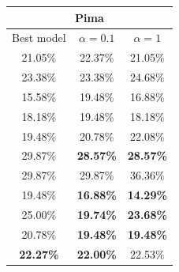 \documentclass[a4paper,12pt ]{report}
\begin{document}
\begin{table}[h]
\begin{minipage}{0.55\textwidth}
\end{minipage}%
\begin{minipage}{0.55\textwidth}
      \centering
          \begin{tabular}{|c | c | c | }
      \hline
      \multicolumn{3}{|c|}{Pima}  \\
      \hline
      Best model & $ \alpha = 0.1 $ & $ \alpha = 1 $ \\  \hline
      21.05\% & 	{22.37\%} & 	{21.05\%}   \\
      23.38\% & 	{23.38\%} & 	{24.68\%}  \\
      15.58\% & 	{19.48\%} & 	{16.88\%}  \\
      18.18\% & 	{19.48\%} & 	{18.18\%}  \\
      19.48\% & 	{20.78\%} & 	{22.08\%}  \\
      29.87\% & 	\textbf{28.57\%} & 	\textbf{28.57\%}  \\
      29.87\% & 	{29.87\%} & 	{36.36\%}  \\
      19.48\% & 	\textbf{16.88\%} & 	\textbf{14.29\%}  \\
      25.00\% & 	\textbf{19.74\%} & 	\textbf{23.68\%}  \\
      20.78\% & 	\textbf{19.48\%} & 	\textbf{19.48\%}  \\ \hline \hline
       \textbf{22.27\%} & 	 \textbf{22.00\%} & 	 {22.53\%} \\

      \hline 
      \end{tabular}

\end{minipage}%

\end{table}
\end{document}
